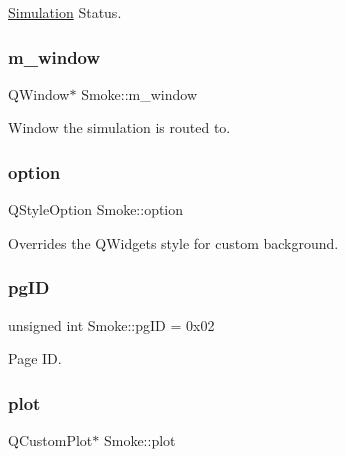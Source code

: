 \mbox{\hyperlink{classSimulation}{Simulation}} Status. 

\mbox{\label{classSmoke_a75cc318af83d2cf39a6609b8becafe38}} 
\subsubsection{\texorpdfstring{m\_window}{m\_window}}
{\footnotesize\ttfamily Q\+Window$\ast$ Smoke\+::m\+\_\+window\hspace{0.3cm}{\ttfamily [private]}}



Window the simulation is routed to. 

\mbox{\label{classSmoke_adaf76ba29af2bc7105de57280a7e0993}} 
\subsubsection{\texorpdfstring{option}{option}}
{\footnotesize\ttfamily Q\+Style\+Option Smoke\+::option\hspace{0.3cm}{\ttfamily [private]}}



Overrides the Q\+Widget\textquotesingle{}s style for custom background. 

\mbox{\label{classSmoke_a85ac4d6389daf0b33572436f18141397}} 
\subsubsection{\texorpdfstring{pgID}{pgID}}
{\footnotesize\ttfamily unsigned int Smoke\+::pg\+ID = 0x02}



Page ID. 

\mbox{\label{classSmoke_a5c1910ba7c1f3ae49b5e753d35e9156b}} 
\subsubsection{\texorpdfstring{plot}{plot}}
{\footnotesize\ttfamily Q\+Custom\+Plot$\ast$ Smoke\+::plot\hspace{0.3cm}{\ttfamily [private]}}



